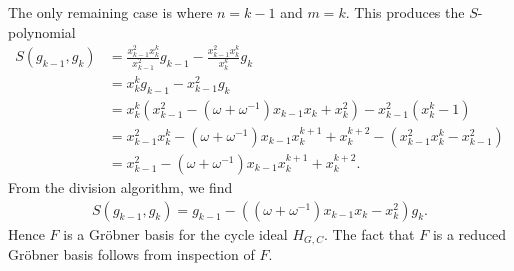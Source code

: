 \documentclass[letterpaper]{article}
\newcommand{\aln}[1]{\begin{align*} #1 \end{align*}} %
\newcommand{\fitp}[1]{\left( #1 \right)} %
\begin{document}
The only remaining case is where $n = k - 1$ and $m = k$. This produces the $S$-polynomial
\aln{
  S(g_{k-1}, g_k) &= \frac{x_{k-1}^2 x_k^k}{x_{k-1}^2} g_{k-1} - \frac{x_{k-1}^2 x_k^k}{x_k^k} g_k\\
  &= x_k^k g_{k-1} - x_{k-1}^2 g_k\\
  &= x_k^k \fitp{x_{k-1}^2 - (\omega + \omega^{-1}) x_{k-1} x_k + x_k^2} - x_{k-1}^2 (x_k^k - 1)\\
  &= x_{k-1}^2 x_k^k - (\omega + \omega^{-1}) x_{k-1} x_k^{k+1} + x_k^{k+2} - (x_{k-1}^2 x_k^k - x_{k-1}^2)\\
  &= x_{k-1}^2 - (\omega + \omega^{-1}) x_{k-1} x_k^{k+1} + x_k^{k+2}.
}
From the division algorithm, we find
\aln{
  S(g_{k-1}, g_k) = g_{k-1} - \fitp{(\omega + \omega^{-1}) x_{k-1} x_k - x_k^2} g_k.
}
Hence $F$ is a Gr\"obner basis for the cycle ideal $H_{G,C}$. The fact that $F$ is a reduced Gr\"obner basis follows from inspection of $F$.
\end{document}

